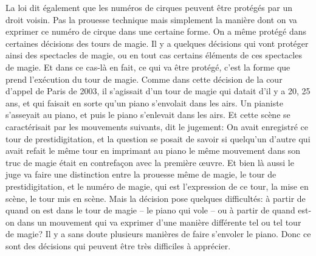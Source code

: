 {La loi dit \'egalement que les num\'eros de cirques peuvent \^etre
prot\'eg\'es par un droit voisin. Pas la prouesse technique mais
simplement la mani\`ere dont on va exprimer ce num\'ero de cirque dans
une certaine forme. On a m\^eme prot\'eg\'e dans certaines d\'ecisions
des tours de magie. Il y a quelques d\'ecisions qui vont prot\'eger
ainsi des spectacles de magie, ou en tout cas certains \'el\'ements de
ces spectacles de magie. Et dans ce cas{}-l\`a en fait, ce qui va
\^etre prot\'eg\'e, c'est la forme que prend l'ex\'ecution du tour de
magie. Comme dans cette d\'ecision de la cour d'appel de Paris de 2003,
il s'agissait d'un tour de magie qui datait d'il y a 20, 25 ans, et qui
faisait en sorte qu'un piano s'envolait dans les airs. Un pianiste
s'asseyait au piano, et puis le piano s'enlevait dans les airs. Et
cette sc\`ene se caract\'erisait par les mouvements suivants, dit le
jugement:  On avait enregistr\'e ce tour de
prestidigitation, et la question se posait de savoir si quelqu'un
d'autre qui avait refait le m\^eme tour en imprimant au piano le m\^eme
mouvement dans son truc de magie \'etait en contrefa\c{c}on avec la
premi\`ere {\oe}uvre. Et bien l\`a aussi le juge va faire une
distinction entre la prouesse m\^eme de magie, le tour de
prestidigitation, et le num\'ero de magie, qui est l'expression de ce
tour, la mise en sc\`ene, le tour mis en sc\`ene. Mais la d\'ecision
pose quelques difficult\'es: \`a partir de quand on est dans le tour de
magie {--} le piano qui vole {--} ou \`a partir de quand est{}-on dans
un mouvement qui va exprimer d'une mani\`ere diff\'erente tel ou tel
tour de magie? Il y a sans doute plusieurs mani\`eres de faire
s'envoler le piano. Donc ce sont des d\'ecisions qui peuvent \^etre
tr\`es difficiles \`a appr\'ecier.\par

}
